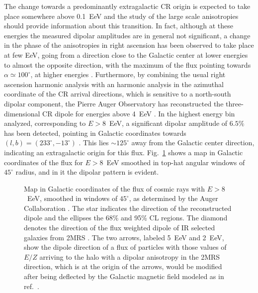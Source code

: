 \documentclass[twoside,12pt]{article}
\begin{document}
The change towards a predominantly extragalactic CR origin is expected to take place  somewhere above 0.1~EeV and  the study of the large scale  anisotropies should provide information about this transition. 
In fact, although at these energies the measured dipolar amplitudes are in general not significant, a change in the  phase of the anisotropies in right ascension  has been observed to take place at few EeV, going from a direction close to the Galactic center at lower energies to almost the opposite direction, with the maximum of the flux  pointing towards $\alpha \simeq 100^\circ$, at higher energies \cite{LS11,LS12,LS15}. Furthermore, by combining  the usual right ascension harmonic analysis with an harmonic analysis in the azimuthal coordinate of the CR arrival directions, which is sensitive to a north-south dipolar component, the Pierre Auger Observatory has reconstructed the three-dimensional CR dipole for energies above 4~EeV \cite{LS15}. In the highest energy bin analyzed, corresponding to $E > 8$~EeV, a significant dipolar amplitude of $6.5\%$ has been detected, pointing in Galactic coordinates towards $(l, b) = (233^\circ,−13^\circ)$ 
\cite{LS17}.
 This lies $\sim 125^\circ$ away from the Galactic center direction, indicating an extragalactic origin for this  flux. Fig.~\ref{augerdip} shows a map in 
Galactic 
coordinates of the flux for $E>8$~EeV smoothed in top-hat angular windows of $45^\circ$ radius, and in it the dipolar pattern is evident.

\begin{figure}
\begin{center}
\begin{minipage}[t]{8 cm}
\centerline{}
\end{minipage}
\begin{minipage}[t]{16.5 cm}
\caption{Map in Galactic coordinates of the flux of cosmic rays with $E > 8$~EeV, smoothed in  windows of $45^\circ$, as determined by the Auger Collaboration \cite{LS17}. The star indicates the direction of the reconstructed dipole and the ellipses the 68\% and 95\% CL regions. The diamond denotes the direction of the flux weighted dipole of IR selected galaxies from 2MRS \cite{erdogdu06}. The two arrows, labeled 5~EeV and 2~EeV, show the dipole direction of a flux of particles with those values of $E/Z$ arriving to the halo with a dipolar anisotropy in the 2MRS direction, which is at the origin of the arrows, would be modified after being deflected by the Galactic magnetic field modeled as in ref.~\cite{jf12}.\label{augerdip}}
\end{minipage}
\end{center}
\end{figure}
\end{document}
